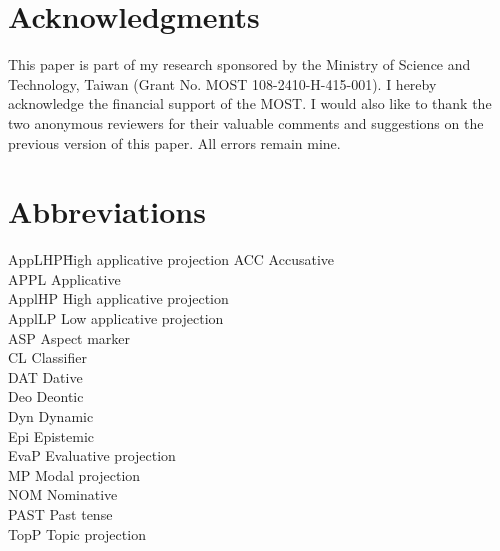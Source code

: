 \documentclass[output=paper,colorlinks,citecolor=brown]{langscibook}
\begin{document}
\section*{Acknowledgments}
This paper is part of my research sponsored by the Ministry of Science and Technology, Taiwan (Grant No. MOST 108-2410-H-415-001). I hereby acknowledge the financial support of the MOST. I would also like to thank the two anonymous reviewers for their valuable comments and suggestions on the previous version of this paper. All errors remain mine.


\section*{Abbreviations}
\begin{multicols}{2}
\begin{tabbing}
AppLHP\hspace{1ex}\=High applicative projection\kill
ACC \> Accusative\\ 
APPL \> Applicative\\ 
ApplHP \> High applicative projection\\ 
ApplLP \> Low applicative projection\\
ASP \> Aspect marker\\ 
CL \> Classifier\\
DAT \> Dative\\
Deo \> Deontic\\
Dyn \> Dynamic\\ 
Epi \> Epistemic\\
EvaP \> Evaluative projection\\ 
MP \> Modal projection\\ 
NOM \> Nominative\\ 
PAST \> Past tense\\ 
TopP \> Topic projection
\end{tabbing}
\end{multicols}

{\sloppy\printbibliography[heading=subbibliography,notkeyword=this]}
\end{document}
